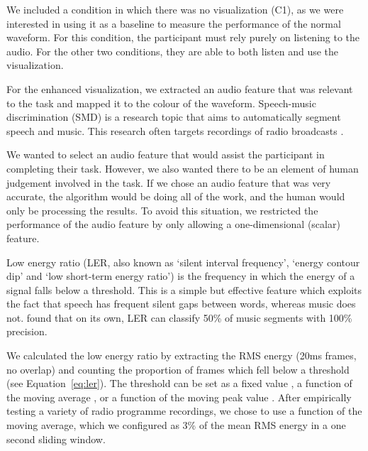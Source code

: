 We included a condition in which there was no visualization (C1), as we were interested in using it as a baseline to
measure the performance of the normal waveform. For this condition, the participant must rely purely on listening to
the audio.  For the other two conditions, they are able to both listen and use the visualization.

For the enhanced visualization, we extracted an audio feature that was relevant to the task and mapped it to the colour
of the waveform.
Speech-music discrimination (SMD) is a research topic that aims to automatically segment speech and music.  This
research often targets recordings of radio broadcasts
\citep{Goodwin2004,Wieser2014,Saunders1996,Pikrakis2008,Pikrakis2006a}.

We wanted to select an audio feature that would assist the participant in completing their task.  However, we also
wanted there to be an element of human judgement involved in the task. If we chose an audio feature that was very
accurate, the algorithm would be doing all of the work, and the human would only be processing the results.  To avoid
this situation, we restricted the performance of the audio feature by only allowing a one-dimensional (scalar) feature.

Low energy ratio (LER, also known as `silent interval frequency', `energy contour dip' and `low short-term energy
ratio') is the frequency in which the energy of a signal falls below a threshold. This is a simple but effective
feature which exploits the fact that speech has frequent silent gaps between words, whereas music does not.
\citet{Panagiotakis2005} found that on its own, LER can classify 50\% of music segments with 100\% precision.

We calculated the low energy ratio by extracting the RMS energy (20ms frames, no overlap) and counting the proportion
of frames which fell below a threshold (see Equation~\ref{eq:ler}).  The threshold can be set as a fixed value
\citep{Liang2005,Panagiotakis2005}, a function of the moving average \citep{Ericsson2009}, or a function of the moving
peak value \citep{Saunders1996}.  After empirically testing a variety of radio programme recordings, we chose to use a
function of the moving average, which we configured as 3\% of the mean RMS energy in a one second sliding window.

